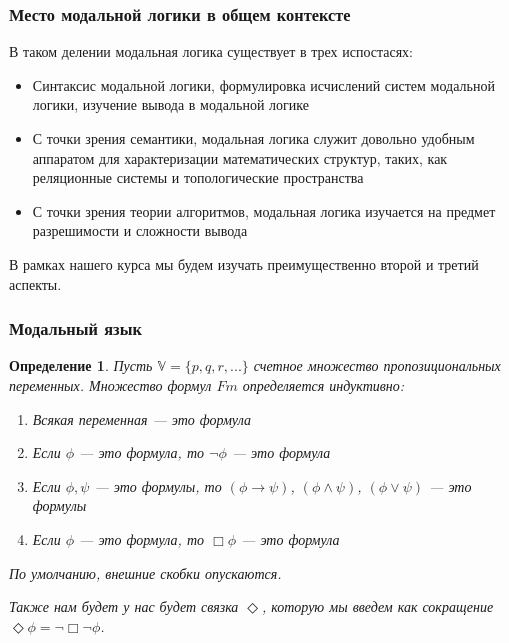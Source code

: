 \documentclass[pdf,utf8,russian,aspectratio=169]{beamer}
\newtheorem{defin}{Определение}
\begin{document}
\begin{frame}
  \frametitle{Место модальной логики в общем контексте}
  В таком делении модальная логика существует в трех испостасях:

  \begin{itemize}
    \item Синтаксис модальной логики, формулировка исчислений систем модальной логики, изучение вывода в модальной логике
    \item С точки зрения семантики, модальная логика служит довольно удобным аппаратом для характеризации математических структур, таких, как реляционные системы и топологические пространства
    \item С точки зрения теории алгоритмов, модальная логика изучается на предмет разрешимости и сложности вывода
  \end{itemize}

В рамках нашего курса мы будем изучать преимущественно второй и третий аспекты.
\end{frame}

\begin{frame}
  \frametitle{Модальный язык}

  \begin{defin}
    Пусть $\mathbb{V} = \{ p, q, r, ... \}$ счетное множество пропозициональных переменных. Множество формул $Fm$ определяется
    индуктивно:

    \begin{enumerate}
      \item Всякая переменная --- это формула
      \item Если $\phi$ --- это формула, то $\neg \phi$ --- это формула
      \item Если $\phi, \psi$ --- это формулы, то $(\phi \to \psi)$, $(\phi \land \psi)$, $(\phi \lor \psi)$ --- это формулы
      \item Если $\phi$ --- это формула, то $\Box \phi$ --- это формула
    \end{enumerate}

    По умолчанию, внешние скобки опускаются.

    Также нам будет у нас будет связка $\Diamond$, которую мы введем как сокращение $\Diamond \phi = \neg \Box \neg \phi$.
  \end{defin}
\end{frame}
\end{document}

